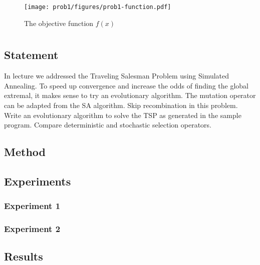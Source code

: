 \documentclass{article}
\begin{document}
\begin{figure}[h]
    \centering
    \texttt{[image: prob1/figures/prob1-function.pdf]}
    \caption{The objective function $f(x)$}\label{fig:prob1:function}
\end{figure}

\section{}\label{prob:2}
\subsection{Statement}
In lecture we addressed the Traveling Salesman Problem using Simulated Annealing. To speed up
convergence and increase the odds of finding the global extremal, it makes sense to try an
evolutionary algorithm. The mutation operator can be adapted from the SA algorithm. Skip
recombination in this problem. Write an evolutionary algorithm to solve the TSP as generated in the
sample program. Compare deterministic and stochastic selection operators.

\subsection{Method}
\subsection{Experiments}
\subsubsection{Experiment 1}
\subsubsection{Experiment 2}

\subsection{Results}
\end{document}

